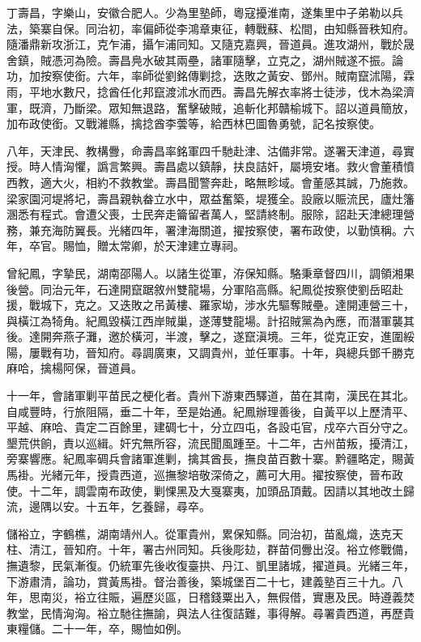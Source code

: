 \begin{pinyinscope}
丁壽昌，字樂山，安徽合肥人。少為里塾師，粵寇擾淮南，遂集里中子弟勒以兵法，築寨自保。同治初，率偏師從李鴻章東征，轉戰蘇、松間，由知縣晉秩知府。隨潘鼎新攻浙江，克乍浦，攝乍浦同知。又隨克嘉興，晉道員。進攻湖州，戰於晟舍鎮，賊憑河為險。壽昌鳧水破其兩壘，諸軍隨擊，立克之，湖州賊遂不振。論功，加按察使銜。六年，率師從劉銘傳剿捻，迭敗之黃安、鄧州。賊南竄沭陽，霖雨，平地水數尺，捻酋任化邦竄渡沭水而西。壽昌先解衣率將士徒涉，伐木為梁濟軍，既濟，乃斷梁。眾知無退路，奮擊破賊，追斬化邦贛榆城下。詔以道員簡放，加布政使銜。又戰濰縣，擒捻酋李蕓等，給西林巴圖魯勇號，記名按察使。

八年，天津民、教構釁，命壽昌率銘軍四千馳赴津、沽備非常。遂署天津道，尋實授。時人情洶懼，譌言繁興。壽昌處以鎮靜，扶良詰奸，屬境安堵。救火會董積憤西教，適大火，相約不救教堂。壽昌聞警奔赴，略無畛域。會董感其誠，乃施救。梁家園河堤將圮，壽昌親執畚立水中，眾益奮築，堤獲全。設廠以賑流民，廬灶籓溷悉有程式。會遭父喪，士民奔走籥留者萬人，堅請終制。服除，詔赴天津總理營務，兼充海防翼長。光緒四年，署津海關道，擢按察使，署布政使，以勤慎稱。六年，卒官。賜恤，贈太常卿，於天津建立專祠。

曾紀鳳，字摯民，湖南邵陽人。以諸生從軍，洊保知縣。駱秉章督四川，調領湘果後營。同治元年，石達開竄踞敘州雙龍場，分軍陷高縣。紀鳳從按察使劉岳昭赴援，戰城下，克之。又迭敗之吊黃樓、羅家坳，涉水先驅奪賊壘。達開連營三十，與橫江為犄角。紀鳳毀橫江西岸賊巢，遂薄雙龍場。計招賊黨為內應，而潛軍襲其後。達開奔燕子灘，邀於橫河，半渡，擊之，遂竄滇境。三年，從克正安，進圍綏陽，屢戰有功，晉知府。尋調廣東，又調貴州，並任軍事。十年，與總兵鄧千勝克麻哈，擒楊阿保，晉道員。

十一年，會諸軍剿平苗民之梗化者。貴州下游東西驛道，苗在其南，漢民在其北。自咸豐時，行旅阻隔，垂二十年，至是始通。紀鳳辦理善後，自黃平以上歷清平、平越、麻哈、貴定二百餘里，建碉七十，分立四屯，各設屯官，戍卒六百分守之。墾荒供餉，責以巡緝。奸宄無所容，流民聞風踵至。十二年，古州苗叛，擾清江，旁寨響應。紀鳳率碉兵會諸軍進剿，擒其酋長，撫良苗百數十寨。黔疆略定，賜黃馬褂。光緒元年，授貴西道，巡撫黎培敬深倚之，薦可大用。擢按察使，晉布政使。十二年，調雲南布政使，剿惈黑及大戛寨夷，加頭品頂戴。因請以其地改土歸流，邊隅以安。十五年，乞養歸，尋卒。

儲裕立，字鶴樵，湖南靖州人。從軍貴州，累保知縣。同治初，苗亂熾，迭克天柱、清江，晉知府。十年，署古州同知。兵後彫攰，群苗伺釁出沒。裕立修戰備，撫遺黎，民氣漸復。仍統軍先後收復臺拱、丹江、凱里諸城，擢道員。光緒三年，下游肅清，論功，賞黃馬褂。督治善後，築城堡百二十七，建義塾百三十九。八年，思南災，裕立往賑，遍歷災區，日稽錢粟出入，無假借，實惠及民。時遵義焚教堂，民情洶洶。裕立馳往撫諭，與法人往復詰難，事得解。尋署貴西道，再歷貴東糧儲。二十一年，卒，賜恤如例。


\end{pinyinscope}
